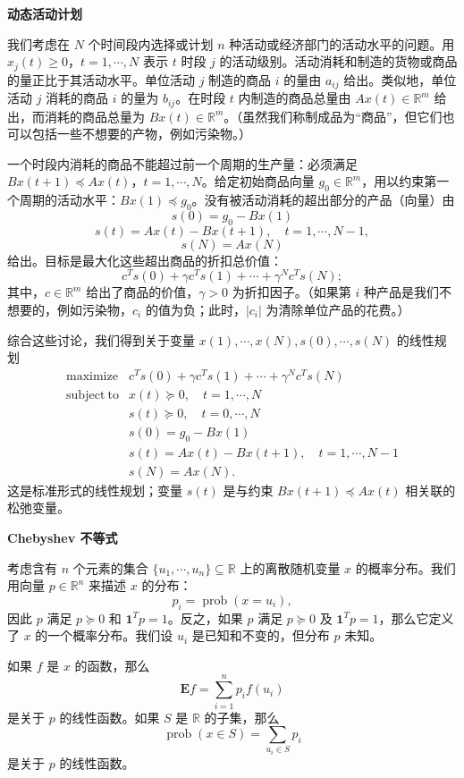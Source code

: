 \documentclass[UTF8, 12pt, fontset=fandol, oneside]{ctexart}
\begin{document}
\noindent\textbf{动态活动计划}

我们考虑在 $N$ 个时间段内选择或计划 $n$ 种活动或经济部门的活动水平的问题。用 $x_j(t)\geq 0$，$t=1,\cdots,N$ 表示 $t$ 时段 $j$ 的活动级别。活动消耗和制造的货物或商品的量正比于其活动水平。单位活动 $j$ 制造的商品 $i$ 的量由 $a_{ij}$ 给出。类似地，单位活动 $j$ 消耗的商品 $i$ 的量为 $b_{ij}$。在时段 $t$ 内制造的商品总量由 $Ax(t)\in\mathbb{R}^m$ 给出，而消耗的商品总量为 $Bx(t)\in\mathbb{R}^m$。（虽然我们称制成品为“商品”，但它们也可以包括一些不想要的产物，例如污染物。）

一个时段内消耗的商品不能超过前一个周期的生产量：必须满足 $Bx(t+1)\preceq Ax(t)$，$t=1,\cdots,N$。给定初始商品向量 $g_0\in\mathbb{R}^m$，用以约束第一个周期的活动水平：$Bx(1)\preceq g_0$。没有被活动消耗的超出部分的产品（向量）由
\[
s(0)=g_0-Bx(1)
\]
\[
s(t)=Ax(t)-Bx(t+1),\quad t=1,\cdots,N-1,
\]
\[
s(N)=Ax(N)
\]
给出。目标是最大化这些超出商品的折扣总价值：
\[
c^Ts(0)+\gamma c^Ts(1)+\cdots+\gamma^N c^Ts(N);
\]
其中，$c\in\mathbb{R}^m$ 给出了商品的价值，$\gamma>0$ 为折扣因子。（如果第 $i$ 种产品是我们不想要的，例如污染物，$c_i$ 的值为负；此时，$|c_i|$ 为清除单位产品的花费。）

综合这些讨论，我们得到关于变量 $x(1),\cdots,x(N),s(0),\cdots,s(N)$ 的线性规划
\[
\begin{array}{ll}
\mathop{\mathrm{maximize}} & c^Ts(0)+\gamma c^Ts(1)+\cdots+\gamma^N c^Ts(N)\\
\mathrm{subject\ to} & x(t)\succeq 0,\quad t=1,\cdots,N\\
& s(t)\succeq 0,\quad t=0,\cdots,N\\
& s(0)=g_0-Bx(1)\\
& s(t)=Ax(t)-Bx(t+1),\quad t=1,\cdots,N-1\\
& s(N)=Ax(N).
\end{array}
\]
这是标准形式的线性规划；变量 $s(t)$ 是与约束 $Bx(t+1)\preceq Ax(t)$ 相关联的松弛变量。

\noindent\textbf{Chebyshev 不等式}

考虑含有 $n$ 个元素的集合 $\{u_1,\cdots,u_n\}\subseteq\mathbb{R}$ 上的离散随机变量 $x$ 的概率分布。我们用向量 $p\in\mathbb{R}^n$ 来描述 $x$ 的分布：
\[
p_i=\operatorname{prob}(x=u_i),
\]
因此 $p$ 满足 $p\succeq 0$ 和 $\mathbf{1}^Tp=1$。反之，如果 $p$ 满足 $p\succeq 0$ 及 $\mathbf{1}^Tp=1$，那么它定义了 $x$ 的一个概率分布。我们设 $u_i$ 是已知和不变的，但分布 $p$ 未知。

如果 $f$ 是 $x$ 的函数，那么
\[
\mathbf{E}f=\sum_{i=1}^{n}p_i f(u_i)
\]
是关于 $p$ 的线性函数。如果 $S$ 是 $\mathbb{R}$ 的子集，那么
\[
\operatorname{prob}(x\in S)=\sum_{u_i\in S}p_i
\]
是关于 $p$ 的线性函数。
\end{document}
